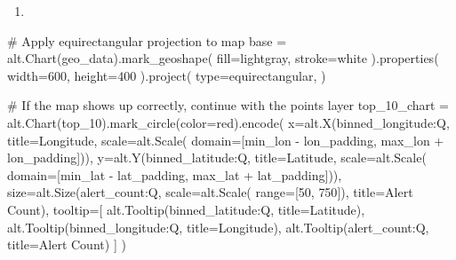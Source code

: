 \documentclass[
  letterpaper,
  DIV=11,
  numbers=noendperiod]{scrartcl}
\newenvironment{Shaded}{\begin{snugshade}}{\end{snugshade}}
\newcommand{\BuiltInTok}[1]{\textcolor[rgb]{0.00,0.23,0.31}{#1}}
\newcommand{\CommentTok}[1]{\textcolor[rgb]{0.37,0.37,0.37}{#1}}
\newcommand{\DecValTok}[1]{\textcolor[rgb]{0.68,0.00,0.00}{#1}}
\newcommand{\NormalTok}[1]{\textcolor[rgb]{0.00,0.23,0.31}{#1}}
\newcommand{\OperatorTok}[1]{\textcolor[rgb]{0.37,0.37,0.37}{#1}}
\newcommand{\StringTok}[1]{\textcolor[rgb]{0.13,0.47,0.30}{#1}}
\providecommand{\tightlist}{%
  \setlength{\itemsep}{0pt}\setlength{\parskip}{0pt}}\usepackage{longtable,booktabs,array}
\begin{document}
\begin{enumerate}
\def\labelenumi{\arabic{enumi}.}
\setcounter{enumi}{3}
\tightlist
\item
\end{enumerate}

\begin{Shaded}
\begin{Highlighting}[]
\CommentTok{\# Apply equirectangular projection to map}
\NormalTok{base }\OperatorTok{=}\NormalTok{ alt.Chart(geo\_data).mark\_geoshape(}
\NormalTok{    fill}\OperatorTok{=}\StringTok{\textquotesingle{}lightgray\textquotesingle{}}\NormalTok{,}
\NormalTok{    stroke}\OperatorTok{=}\StringTok{\textquotesingle{}white\textquotesingle{}}
\NormalTok{).properties(}
\NormalTok{    width}\OperatorTok{=}\DecValTok{600}\NormalTok{,}
\NormalTok{    height}\OperatorTok{=}\DecValTok{400}
\NormalTok{).project(}
    \BuiltInTok{type}\OperatorTok{=}\StringTok{\textquotesingle{}equirectangular\textquotesingle{}}\NormalTok{,}
\NormalTok{)}

\CommentTok{\# If the map shows up correctly, continue with the points layer}
\NormalTok{top\_10\_chart }\OperatorTok{=}\NormalTok{ alt.Chart(top\_10).mark\_circle(color}\OperatorTok{=}\StringTok{\textquotesingle{}red\textquotesingle{}}\NormalTok{).encode(}
\NormalTok{    x}\OperatorTok{=}\NormalTok{alt.X(}\StringTok{\textquotesingle{}binned\_longitude:Q\textquotesingle{}}\NormalTok{, title}\OperatorTok{=}\StringTok{\textquotesingle{}Longitude\textquotesingle{}}\NormalTok{, scale}\OperatorTok{=}\NormalTok{alt.Scale(}
\NormalTok{        domain}\OperatorTok{=}\NormalTok{[min\_lon }\OperatorTok{{-}}\NormalTok{ lon\_padding, max\_lon }\OperatorTok{+}\NormalTok{ lon\_padding])),}
\NormalTok{    y}\OperatorTok{=}\NormalTok{alt.Y(}\StringTok{\textquotesingle{}binned\_latitude:Q\textquotesingle{}}\NormalTok{, title}\OperatorTok{=}\StringTok{\textquotesingle{}Latitude\textquotesingle{}}\NormalTok{, scale}\OperatorTok{=}\NormalTok{alt.Scale(}
\NormalTok{        domain}\OperatorTok{=}\NormalTok{[min\_lat }\OperatorTok{{-}}\NormalTok{ lat\_padding, max\_lat }\OperatorTok{+}\NormalTok{ lat\_padding])),}
\NormalTok{    size}\OperatorTok{=}\NormalTok{alt.Size(}\StringTok{\textquotesingle{}alert\_count:Q\textquotesingle{}}\NormalTok{, scale}\OperatorTok{=}\NormalTok{alt.Scale(}
        \BuiltInTok{range}\OperatorTok{=}\NormalTok{[}\DecValTok{50}\NormalTok{, }\DecValTok{750}\NormalTok{]), title}\OperatorTok{=}\StringTok{\textquotesingle{}Alert Count\textquotesingle{}}\NormalTok{),}
\NormalTok{    tooltip}\OperatorTok{=}\NormalTok{[}
\NormalTok{        alt.Tooltip(}\StringTok{\textquotesingle{}binned\_latitude:Q\textquotesingle{}}\NormalTok{, title}\OperatorTok{=}\StringTok{\textquotesingle{}Latitude\textquotesingle{}}\NormalTok{),}
\NormalTok{        alt.Tooltip(}\StringTok{\textquotesingle{}binned\_longitude:Q\textquotesingle{}}\NormalTok{, title}\OperatorTok{=}\StringTok{\textquotesingle{}Longitude\textquotesingle{}}\NormalTok{),}
\NormalTok{        alt.Tooltip(}\StringTok{\textquotesingle{}alert\_count:Q\textquotesingle{}}\NormalTok{, title}\OperatorTok{=}\StringTok{\textquotesingle{}Alert Count\textquotesingle{}}\NormalTok{)}
\NormalTok{    ]}
\NormalTok{)}


\end{Highlighting}
\end{Shaded}
\end{document}
